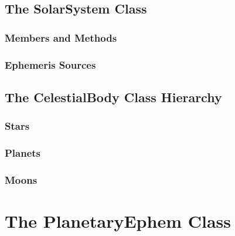 \subsection{The SolarSystem Class}

\subsubsection{Members and Methods}

\subsubsection{Ephemeris Sources}

\subsection{The CelestialBody Class Hierarchy}

\subsubsection{Stars}

\subsubsection{Planets}

\subsubsection{Moons}

\section{The PlanetaryEphem Class}

